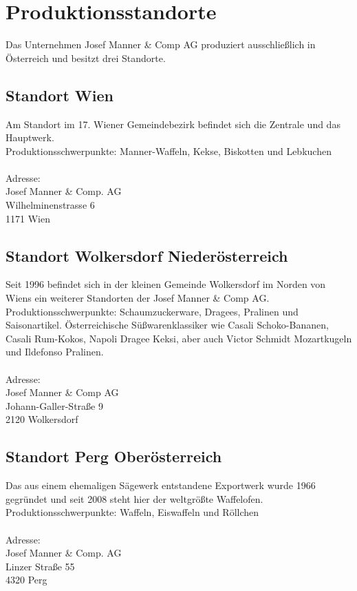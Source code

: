\section{Produktionsstandorte}
Das Unternehmen Josef Manner \& Comp AG produziert ausschließlich in Österreich und besitzt drei Standorte.

\subsection{Standort Wien}
Am Standort im 17. Wiener Gemeindebezirk befindet sich die Zentrale und das Hauptwerk.\\
Produktionsschwerpunkte: Manner-Waffeln, Kekse, Biskotten und Lebkuchen\\
\\
Adresse:\\
Josef Manner \& Comp. AG\\
Wilhelminenstrasse 6\\
1171 Wien

\subsection{Standort Wolkersdorf Niederösterreich}
Seit 1996 befindet sich in der kleinen Gemeinde Wolkersdorf im Norden von Wiens ein weiterer Standorten der Josef Manner \& Comp AG.\\
Produktionsschwerpunkte: Schaumzuckerware, Dragees, Pralinen und Saisonartikel. Österreichische Süßwarenklassiker wie Casali Schoko-Bananen, Casali Rum-Kokos, Napoli Dragee Keksi, aber auch Victor Schmidt Mozartkugeln und Ildefonso Pralinen.\\
\\
Adresse:\\
Josef Manner \& Comp AG\\
Johann-Galler-Straße 9\\
2120 Wolkersdorf

\subsection{Standort Perg Oberösterreich}
Das aus einem ehemaligen Sägewerk entstandene Exportwerk wurde 1966 gegründet und seit 2008 steht hier der weltgrößte Waffelofen.\\
Produktionsschwerpunkte:  Waffeln, Eiswaffeln und Röllchen\\
\\
Adresse:\\
Josef Manner \& Comp. AG\\
Linzer Straße 55\\
4320 Perg\\
\cite{josef_manner_unternehmen}
